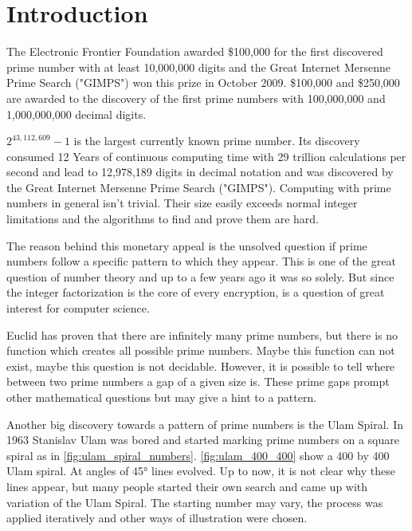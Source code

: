 \section{Introduction}
\label{sec:intro}

The Electronic Frontier Foundation awarded \$100,000 for the first discovered prime number with at least 10,000,000 digits and the Great Internet Mersenne Prime Search ("GIMPS") won this prize in October 2009. \$100,000 and \$250,000 are awarded to the discovery of the first prime numbers with 100,000,000 and 1,000,000,000 decimal digits.

$2^{43,112,609}-1$ is the largest currently known prime number. Its discovery consumed 12 Years of continuous computing time with 29 trillion calculations per second and lead to 12,978,189 digits in decimal notation and was discovered by the Great Internet Mersenne Prime Search ("GIMPS").
Computing with prime numbers in general isn't trivial. Their size easily exceeds normal integer limitations and the algorithms to find and prove them are hard.

The reason behind this monetary appeal is the unsolved question if prime numbers follow a specific pattern to which they appear. This is one of the great question of number theory and up to a few years ago it was so solely. But since the integer factorization is the core of every encryption, is a question of great interest for computer science.  

Euclid has proven that there are infinitely many prime numbers, but there is no function which creates all possible prime numbers. Maybe this function can not exist, maybe this question is not decidable.\cite{zahlentheorie} However, it is possible to tell where between two prime numbers a gap of a given size is. These prime gaps prompt other mathematical questions but may give a hint to a pattern.

Another big discovery towards a pattern of prime numbers is the Ulam Spiral. In 1963 Stanislav Ulam was bored and started marking prime numbers on a square spiral as in \ref{fig:ulam_spiral_numbers}. \ref{fig:ulam_400_400} show a 400 by 400 Ulam spiral. At angles of 45° lines evolved. Up to now, it is not clear why these lines appear, but many people started their own search and came up with variation of the Ulam Spiral. The starting number may vary, the process was applied iteratively\cite{web} and other ways of illustration were chosen\cite{web}.


\begin{figure}[H]
\begin{minipage}[t]{0.475\textwidth}
\centering
\end{minipage}
\hfill
\begin{minipage}[t]{0.475\textwidth}
\centering
\end{minipage}
\end{figure}

